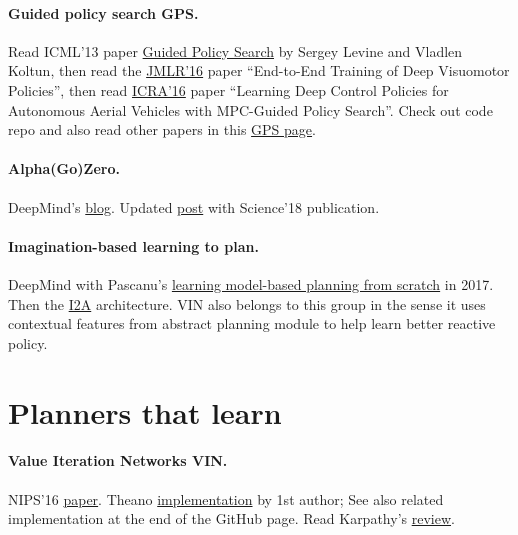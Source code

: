 \documentclass[12pt]{article}
\numberwithin{equation}{section}
\begin{document}
\paragraph{Guided policy search GPS.}
Read ICML'13 paper \href{http://proceedings.mlr.press/v28/levine13.html}{Guided Policy Search} by Sergey Levine and Vladlen Koltun, then read the \href{https://arxiv.org/abs/1504.00702}{JMLR'16} paper ``End-to-End Training of Deep Visuomotor Policies'', then read \href{https://arxiv.org/abs/1509.06791}{ICRA'16} paper ``Learning Deep Control Policies for Autonomous Aerial Vehicles with MPC-Guided Policy Search''. Check out code repo and also read other papers in this \href{http://rll.berkeley.edu/gps/index.html}{GPS page}. 

\paragraph{Alpha(Go)Zero.} DeepMind's \href{https://deepmind.com/blog/alphago-zero-learning-scratch/}{blog}. Updated \href{https://deepmind.com/blog/alphazero-shedding-new-light-grand-games-chess-shogi-and-go/}{post} with Science'18 publication.

\paragraph{Imagination-based learning to plan.} DeepMind with Pascanu's \href{https://www.semanticscholar.org/paper/Learning-model-based-planning-from-scratch-Pascanu-Li/bd1d59433e3b7ae7207c24b4cd1838acea91425c}{learning model-based planning from scratch} in 2017. Then the \href{ https://deepmind.com/blog/agents-imagine-and-plan/}{I2A} architecture. VIN also belongs to this group in the sense it uses contextual features from abstract planning module to help learn better reactive policy.

\section{Planners that learn}

\paragraph{Value Iteration Networks VIN.} NIPS'16 \href{https://papers.nips.cc/paper/6046-value-iteration-networks}{paper}. Theano \href{https://github.com/avivt/VIN}{implementation} by 1st author; See also related implementation at the end of the GitHub page. Read Karpathy's \href{http://www.shortscience.org/paper?bibtexKey=journals/corr/TamarLA16}{review}. 
\end{document}
